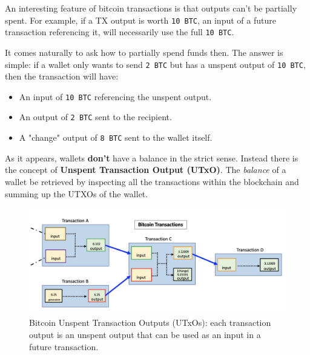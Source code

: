 An interesting feature of bitcoin transactions is that outputs can't be partially spent.
For example, if a TX output is worth \texttt{10 BTC}, an input of a future transaction referencing it, will
necessarily use the full \texttt{10 BTC}.

It comes naturally to ask how to partially spend funds then.
The answer is simple: if a wallet only wants to send \texttt{2 BTC} but has a unspent output of \texttt{10
BTC}, then the transaction will have:
\begin{itemize}
  \item An input of \texttt{10 BTC} referencing the unspent output.
  \item An output of \texttt{2 BTC} sent to the recipient.
  \item A "change" output of \texttt{8 BTC} sent to the wallet itself.
\end{itemize}

As it appears, wallets \textbf{don't} have a balance in the strict sense. Instead there is the concept of
\textbf{Unspent Transaction Output (UTxO)}.
The \textit{balance} of a wallet be retrieved by inspecting all the transactions within the blockchain and
summing up the UTXOs of the wallet.

\begin{figure}[htbp!]
  \centering
  \includegraphics[width=1.0\textwidth]{figures/bitcoin/utxos.jpeg}
  \caption[Bitcoin UTXOs]{Bitcoin Unspent Transaction Outputs (UTxOs): each transaction output is an unspent
  output that can be used as an input in a future transaction.}

  \label{fig:bitcoin_network}
\end{figure}

